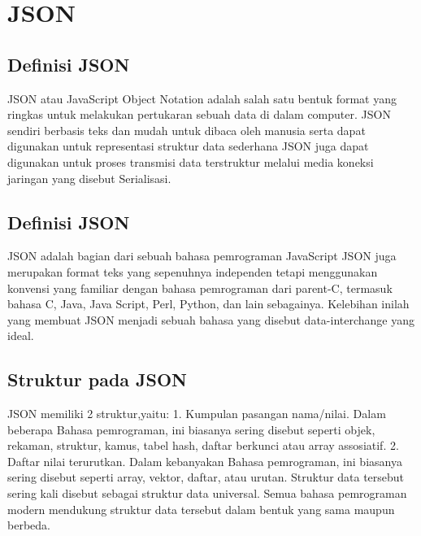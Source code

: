 \documentclass[a4paper]{article}
\begin{document}
\section{JSON}
\subsection{Definisi JSON}
JSON atau JavaScript Object Notation adalah salah satu bentuk format yang ringkas untuk melakukan pertukaran sebuah data di dalam computer. JSON sendiri berbasis teks dan mudah untuk dibaca oleh manusia serta dapat digunakan untuk representasi struktur data sederhana JSON juga dapat digunakan untuk proses transmisi data terstruktur melalui media koneksi jaringan yang disebut Serialisasi.
\subsection{Definisi JSON}
JSON  adalah  bagian  dari  sebuah bahasa  pemrograman  JavaScript  JSON juga merupakan format teks yang sepenuhnya independen tetapi menggunakan konvensi yang  familiar  dengan  bahasa  pemrograman  dari  parent-C,  termasuk  bahasa C,  Java,  Java Script,  Perl, Python,  dan lain sebagainya.  Kelebihan  inilah  yang  membuat  JSON  menjadi  sebuah  bahasa yang disebut  data-interchange yang ideal.
\subsection{Struktur pada JSON}
JSON memiliki 2 struktur,yaitu:
1.	Kumpulan pasangan nama/nilai.
Dalam beberapa Bahasa pemrograman, ini biasanya sering disebut seperti objek, rekaman, struktur, kamus, tabel hash, daftar berkunci atau array assosiatif.
2.	Daftar nilai terurutkan.
Dalam kebanyakan Bahasa pemrograman, ini biasanya sering disebut seperti array, vektor, daftar, atau urutan.
Struktur data tersebut sering kali disebut sebagai struktur data universal. Semua bahasa pemrograman modern mendukung struktur data tersebut dalam bentuk yang sama maupun berbeda.
\end{document}

